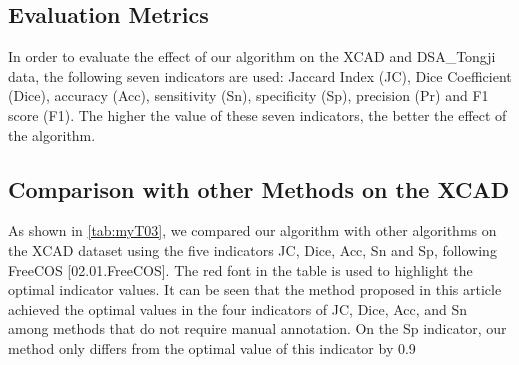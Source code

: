 \subsection{Evaluation Metrics}
In order to evaluate the effect of our algorithm on the XCAD and DSA\_Tongji data, the following seven indicators are used: Jaccard Index (JC), Dice Coefficient (Dice), accuracy (Acc), sensitivity (Sn), specificity (Sp), precision (Pr) and F1 score (F1). The higher the value of these seven indicators, the better the effect of the algorithm.
\subsection{Comparison with other Methods on the XCAD}
As shown in \cref{tab:myT03}, we compared our algorithm with other algorithms on the XCAD dataset using the five indicators JC, Dice, Acc, Sn and Sp, following FreeCOS [02.01.FreeCOS]. The red font in the table is used to highlight the optimal indicator values. It can be seen that the method proposed in this article achieved the optimal values in the four indicators of JC, Dice, Acc, and Sn among methods that do not require manual annotation. On the Sp indicator, our method only differs from the optimal value of this indicator by 0.9%

